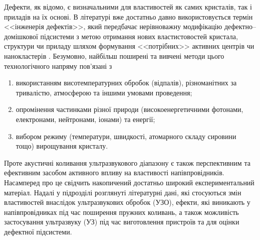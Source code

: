 Дефекти, як відомо, є визначальними для властивостей як самих кристалів, так і приладів на їх основі.
В літературі вже достатньо давно використовується термін
<<інженерія дефектів>>, який передбачає нерівноважну модифікацію дефектно--домішкової підсистеми з метою отримання нових властистовостей кристала, структури чи приладу шляхом формування <<потрібних>> активних центрів чи нанокластерів \cite{Smirnov}.
Безумовно, найбільш поширені та вивчені методи цього технологічного напряму пов'язані з
\begin{enumerate}[label=\asbuk*),leftmargin=0em,itemindent=1.5em]
\item використанням висотемпературних обробок (відпалів), різноманітних за тривалістю, атмосферою та іншими умовами проведення;
\item опромінення частинками різної природи (високоенергетичними фотонами, електронами, нейтронами, іонами) та енергії;
\item вибором режиму (температури, швидкості, атомарного складу сировини тощо) вирощування кристалу.
\end{enumerate}
Проте акустичні коливання ультразвукового діапазону є також перспективним та ефективним засобом активного впливу на властивості напівпровідників.
Насамперед про це свідчить накопичений достатньо широкий експериментальний матеріал.
Надалі у підрозділі розглянуті літературні дані, які стосуються змін властивостей внаслідок ультразвукових обробок (УЗО), ефекти, які виникають у напівпровідниках під час поширення пружних коливань,
а також можливість застосування ультразвуку (УЗ) під час виготовлення пристроїв та для оцінки дефектної підсистеми.

